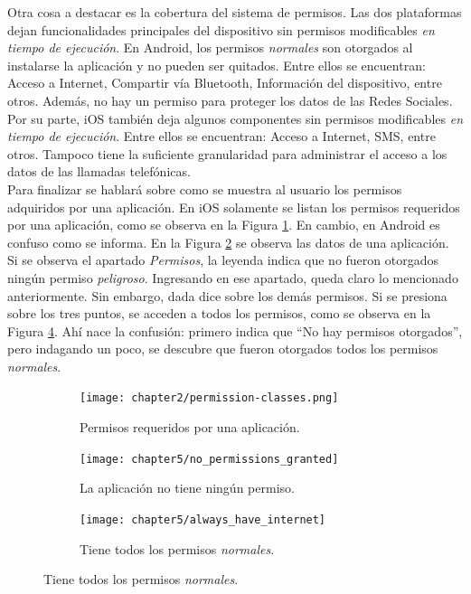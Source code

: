 Otra cosa a destacar es la cobertura del sistema de permisos. Las dos plataformas dejan funcionalidades principales del dispositivo sin permisos modificables \emph{en tiempo de ejecución}. En Android, los permisos \emph{normales} son otorgados al instalarse la aplicación y no pueden ser quitados. Entre ellos se encuentran: Acceso a Internet, Compartir vía Bluetooth, Información del dispositivo, entre otros. Además, no hay un permiso para proteger los datos de las Redes Sociales. Por su parte, iOS también deja algunos componentes sin permisos modificables \emph{en tiempo de ejecución}. Entre ellos se encuentran: Acceso a Internet, SMS, entre otros. Tampoco tiene la suficiente granularidad para administrar el acceso a los datos de las llamadas telefónicas.\\

Para finalizar se hablará sobre como se muestra al usuario los permisos adquiridos por una aplicación. En iOS solamente se listan los permisos requeridos por una aplicación, como se observa en la Figura \ref{fig:ch05:ios_all_permissions}. En cambio, en Android es confuso como se informa. En la Figura \ref{fig:ch05:without_permissions} se observa las datos de una aplicación. Si se observa el apartado \emph{Permisos}, la leyenda indica que no fueron otorgados ningún permiso \emph{peligroso}. Ingresando en ese apartado, queda claro lo mencionado anteriormente. Sin embargo, dada dice sobre los demás permisos. Si se presiona sobre los tres puntos, se acceden a todos los permisos, como se observa en la Figura \ref{fig:ch05:always_have_internet}. Ahí nace la confusión: primero indica que ``No hay permisos otorgados'', pero indagando un poco, se descubre que fueron otorgados todos los permisos \emph{normales}.
\begin{figure}[hbtp]
	\centering
	\begin{subfigure}{.3\linewidth}
		\texttt{[image: chapter2/permission-classes.png]}
		\caption{Permisos requeridos por una aplicación.}
		\label{fig:ch05:ios_all_permissions}
	\end{subfigure}
	\begin{subfigure}{.3\linewidth}
		\texttt{[image: chapter5/no\_permissions\_granted]}
		\caption{La aplicación no tiene ningún permiso.}
		\label{fig:ch05:without_permissions}
	\end{subfigure}
	\begin{subfigure}{.3\linewidth}
		\texttt{[image: chapter5/always\_have\_internet]}
		\caption{Tiene todos los permisos \emph{normales}.}
		\label{fig:ch05:always_have_internet}
	\end{subfigure}
\end{figure}